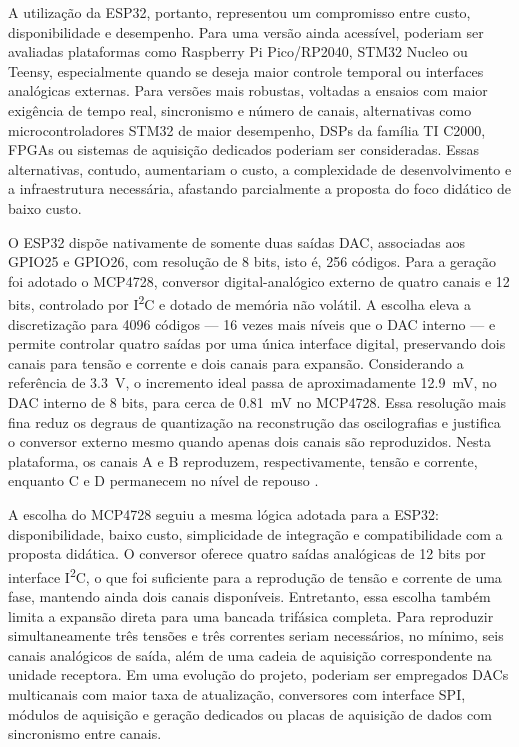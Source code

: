 A utilização da ESP32, portanto, representou um compromisso entre custo, disponibilidade e desempenho. Para uma versão ainda acessível, poderiam ser avaliadas plataformas como Raspberry Pi Pico/RP2040, STM32 Nucleo ou Teensy, especialmente quando se deseja maior controle temporal ou interfaces analógicas externas. Para versões mais robustas, voltadas a ensaios com maior exigência de tempo real, sincronismo e número de canais, alternativas como microcontroladores STM32 de maior desempenho, DSPs da família TI C2000, FPGAs ou sistemas de aquisição dedicados poderiam ser consideradas. Essas alternativas, contudo, aumentariam o custo, a complexidade de desenvolvimento e a infraestrutura necessária, afastando parcialmente a proposta do foco didático de baixo custo.

O ESP32 dispõe nativamente de somente duas saídas DAC, associadas aos GPIO25 e GPIO26, com resolução de 8 bits, isto é, 256 códigos. Para a geração foi adotado o MCP4728, conversor digital-analógico externo de quatro canais e 12 bits, controlado por I\textsuperscript{2}C e dotado de memória não volátil. A escolha eleva a discretização para 4096 códigos --- 16 vezes mais níveis que o DAC interno --- e permite controlar quatro saídas por uma única interface digital, preservando dois canais para tensão e corrente e dois canais para expansão. Considerando a referência de \SI{3,3}{\volt}, o incremento ideal passa de aproximadamente \SI{12,9}{\milli\volt}, no DAC interno de 8 bits, para cerca de \SI{0,81}{\milli\volt} no MCP4728. Essa resolução mais fina reduz os degraus de quantização na reconstrução das oscilografias e justifica o conversor externo mesmo quando apenas dois canais são reproduzidos. Nesta plataforma, os canais A e B reproduzem, respectivamente, tensão e corrente, enquanto C e D permanecem no nível de repouso \cite{microchip_mcp4728}.

A escolha do MCP4728 seguiu a mesma lógica adotada para a ESP32: disponibilidade, baixo custo, simplicidade de integração e compatibilidade com a proposta didática. O conversor oferece quatro saídas analógicas de 12 bits por interface I\textsuperscript{2}C, o que foi suficiente para a reprodução de tensão e corrente de uma fase, mantendo ainda dois canais disponíveis. Entretanto, essa escolha também limita a expansão direta para uma bancada trifásica completa. Para reproduzir simultaneamente três tensões e três correntes seriam necessários, no mínimo, seis canais analógicos de saída, além de uma cadeia de aquisição correspondente na unidade receptora. Em uma evolução do projeto, poderiam ser empregados DACs multicanais com maior taxa de atualização, conversores com interface SPI, módulos de aquisição e geração dedicados ou placas de aquisição de dados com sincronismo entre canais.

